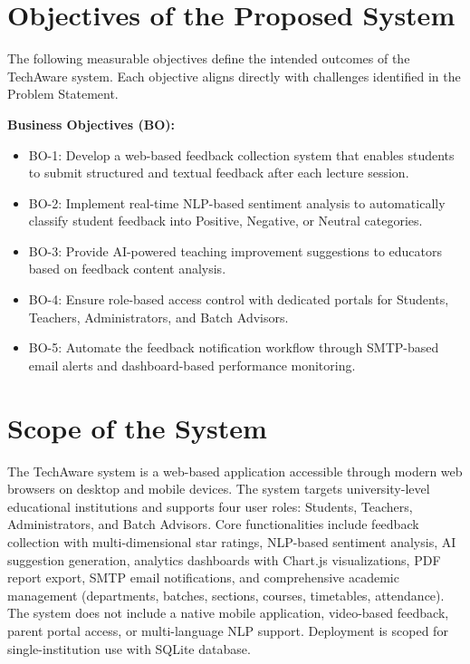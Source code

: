 
\section{Objectives of the Proposed System}

The following measurable objectives define the intended outcomes of the TechAware system. Each objective aligns directly with challenges identified in the Problem Statement.

\vspace{0.3cm}

\textbf{Business Objectives (BO):}

\begin{itemize}
    \item BO-1: Develop a web-based feedback collection system that enables students to submit structured and textual feedback after each lecture session.
    \item BO-2: Implement real-time NLP-based sentiment analysis to automatically classify student feedback into Positive, Negative, or Neutral categories.
    \item BO-3: Provide AI-powered teaching improvement suggestions to educators based on feedback content analysis.
    \item BO-4: Ensure role-based access control with dedicated portals for Students, Teachers, Administrators, and Batch Advisors.
    \item BO-5: Automate the feedback notification workflow through SMTP-based email alerts and dashboard-based performance monitoring.
\end{itemize}




\section{Scope of the System}

The TechAware system is a web-based application accessible through modern web browsers on desktop and mobile devices. The system targets university-level educational institutions and supports four user roles: Students, Teachers, Administrators, and Batch Advisors. Core functionalities include feedback collection with multi-dimensional star ratings, NLP-based sentiment analysis, AI suggestion generation, analytics dashboards with Chart.js visualizations, PDF report export, SMTP email notifications, and comprehensive academic management (departments, batches, sections, courses, timetables, attendance). The system does not include a native mobile application, video-based feedback, parent portal access, or multi-language NLP support. Deployment is scoped for single-institution use with SQLite database.



